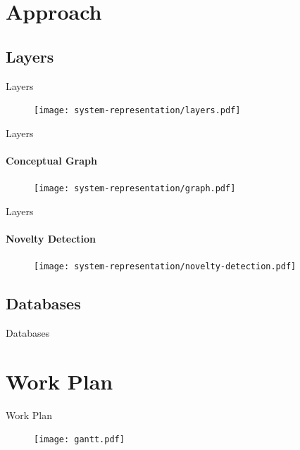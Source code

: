 \documentclass[compress]{beamer}
\begin{document}
\section{Approach}
\subsection{Layers}
\begin{frame}{Layers}
    \begin{figure}
        \texttt{[image: system-representation/layers.pdf]}
    \end{figure}
\end{frame}

\begin{frame}{Layers}
\framesubtitle{Conceptual Graph}
    \begin{figure}
        \texttt{[image: system-representation/graph.pdf]}
    \end{figure}
\end{frame}

\begin{frame}{Layers}
\framesubtitle{Novelty Detection}
    \begin{figure}
        \texttt{[image: system-representation/novelty-detection.pdf]}
    \end{figure}
\end{frame}

\subsection{Databases}
\begin{frame}{Databases}

\end{frame}

\section{Work Plan}
\begin{frame}{Work Plan}
\begin{figure}
\texttt{[image: gantt.pdf]}
\end{figure}

\end{frame}
\end{document}
